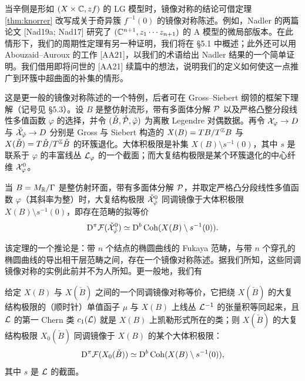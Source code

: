 当辛侧是形如 $(X\times\mathbb{C},zf)$ 的 LG 模型时，镜像对称的结论可借定理 \ref{thm:knorrer} 改写成关于奇异簇 $f^{-1}(0)$ 的镜像对称陈述。例如，Nadler 的两篇论文 [Nad19a; Nad17] 研究了 $(\mathbb{C}^{n+1},z_1\cdots z_{n+1})$ 的 A 模型的微局部版本。在此情形下，我们的周期性定理有另一种证明，我们将在 §5.1 中概述；此外还可以用 Abouzaid–Auroux 的工作 [AA21]，以我们的术语给出 Nadler 结果的一个简单证明。我们借用即将问世的 [AA21] 续篇中的想法，说明我们的定义如何使这一点推广到环簇中超曲面的补集的情形。

这是更一般的镜像对称陈述的一个特例，后者可在 Gross–Siebert 纲领的框架下理解（记号见 §5.3）。设 $B$ 是整仿射流形，带有多面体分解 $\mathcal{P}$ 以及严格凸整分段线性多值函数 $\varphi$ 的选择，并令 $(\check B,\check{\mathcal{P}},\check\varphi)$ 为离散 Legendre 对偶数据。再令 $\mathcal{X}_\varphi\to D$ 与 $\check{\mathcal{X}}_{\check\varphi}\to D$ 分别是 Gross 与 Siebert 构造的 $X(B)=TB/T^{\mathbb{Z}}B$ 与 $X(\check B)=T\check B/T^{\mathbb{Z}}\check B$ 的环簇退化。大体积极限是补集 $X(B)\setminus s^{-1}(0)$，其中 $s$ 是联系于 $\varphi$ 的丰富线丛 $\mathcal{L}_\varphi$ 的一个截面；而大复结构极限是某个环簇退化的中心纤维 $\mathcal{X}^0_\varphi$。

\begin{theorem}[{大复结构极限与大体积极限的镜像对称}]\label{thm:lvl-lcsl}
当 $B=M_{\mathbb{R}}/\Gamma$ 是整仿射环面，带有多面体分解 $\mathcal{P}$，并取定严格凸分段线性多值函数 $\varphi$（其斜率为整）时，大复结构极限 $\check{\mathcal{X}}^0_{\check\varphi}$ 同调镜像于大体积极限 $X(B)\setminus s^{-1}(0)$，即存在范畴的拟等价
\[
\mathrm{D}^\pi\mathcal{F}(\check{\mathcal{X}}^0_{\check\varphi})\simeq\mathrm{D}^b\operatorname{Coh}(X(B)\setminus s^{-1}(0)).
\]
\end{theorem}


该定理的一个推论是：带 $n$ 个结点的椭圆曲线的 Fukaya 范畴，与带 $n$ 个穿孔的椭圆曲线的导出相干层范畴之间，存在一个镜像对称陈述。据我们所知，这些同调镜像对称的实例此前并不为人所知。更一般地，我们有

\begin{theorem}[{大复结构极限处的镜像对称}]\label{thm:lcsl}
给定 $X(B)$ 与 $X(\check B)$ 之间的一个同调镜像对称等价，它把绕 $X(\check B)$ 的大复结构极限的（顺时针）单值函子 $\mu$ 与 $X(B)$ 上线丛 $\mathcal{L}^{-1}$ 的张量积等同起来，且 $\mathcal{L}$ 的第一 Chern 类 $c_1(\mathcal{L})$ 就是 $X(B)$ 上凯勒形式所在的类；则 $X(\check B)$ 的大复结构极限 $X_0(\check B)$ 同调镜像于 $X(B)$ 的某个大体积极限：
\[
\mathrm{D}^\pi\mathcal{F}(X_0(\check B))\simeq\mathrm{D}^b\operatorname{Coh}(X(B)\setminus s^{-1}(0)),
\]
其中 $s$ 是 $\mathcal{L}$ 的截面。
\end{theorem}

